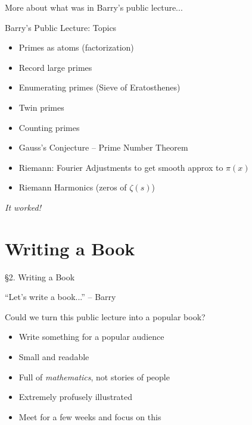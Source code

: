 \documentclass{beamer}
\newcommand{\mysection}[2]{\section{#2}%
\begin{frame}{}
\vfill
\begin{center}
\hrulefill
\vfill
\Huge\sc \S#1. #2
\vfill
\hrulefill
\end{center}
\vfill
\end{frame}}
\begin{document}
\begin{frame}{More about what was in Barry's public lecture...}
  \begin{block}{Barry's Public Lecture: Topics}
    \begin{itemize}
      \item Primes as atoms (factorization)
      \item Record large primes
      \item Enumerating primes (Sieve of Eratosthenes)
      \item Twin primes
      \item Counting primes
      \item Gauss's Conjecture -- Prime Number Theorem
      \item Riemann: Fourier Adjustments to get smooth approx to $\pi(x)$
      \item Riemann Harmonics (zeros of $\zeta(s)$)
    \end{itemize}

  \end{block}
  
  \vfill
  \begin{center}
  \Large
  \emph{It worked!}
\end{center}



\end{frame}

\mysection{2}{Writing a Book}

\begin{frame}{``Let's write a book...'' -- Barry}
  \begin{block}{Could we turn this public lecture into a popular book?}

    \begin{itemize}
      \item Write something for a popular audience
      \item Small and readable
      \item Full of {\em mathematics}, not stories of people
      \item Extremely profusely illustrated
      \item Meet for a few weeks and focus on this
    \end{itemize}
  \end{block}
\end{frame}
\end{document}
